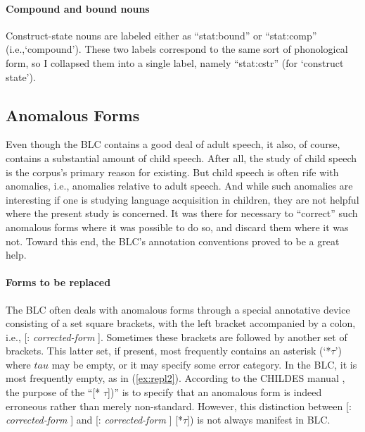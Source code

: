 \paragraph{Compound and bound nouns}
Construct-state nouns are labeled either as ``\textsf{stat:bound}'' 
or ``\textsf{stat:comp}'' (i.e.,`compound'). 
These two labels correspond to the same sort of phonological form, 
 so I collapsed them into a single label, namely 
``\textsf{stat:cstr}'' (for `construct state').


\subsection{Anomalous Forms}\label{sec:anomolous}

Even though the BLC contains a good deal of adult speech, it also, 
of course, contains a substantial amount of child speech. After all, the study of
child speech is the corpus's primary reason for existing. But child speech is often rife
with anomalies, i.e., anomalies relative to adult speech. And while such anomalies are 
interesting if one is studying language acquisition in children, they are not helpful where
the present study is concerned. It was there for necessary to ``correct'' such anomalous 
forms where it was possible to do so, and discard them where it was not. Toward this end, 
the BLC's annotation conventions proved to be a great help.

\paragraph{Forms to be replaced}
The BLC often deals with anomalous forms through a special 
annotative device consisting of a set square brackets, with the left bracket 
accompanied
by a colon, i.e., \textsf{[: \textit{corrected-form} ]}. Sometimes these brackets 
are followed by another set
of brackets. This latter set, if present, most frequently contains an asterisk 
(`*$\tau$') where $tau$ may be empty, or it may specify some error category. 
In the BLC, it is most frequently empty, as in (\ref{ex:repl2}). 
According to the CHILDES manual \citep{macwhinney:2000b}, the purpose of the ``\textsf{[* $\tau$])}'' 
is to specify that an anomalous form is 
indeed erroneous rather than merely non-standard. 
However, this distinction between 
\textsf{[: \textit{corrected-form} ]} and 
\textsf{[: \textit{corrected-form} ] [*{$\tau$}])} is not always manifest in BLC.

